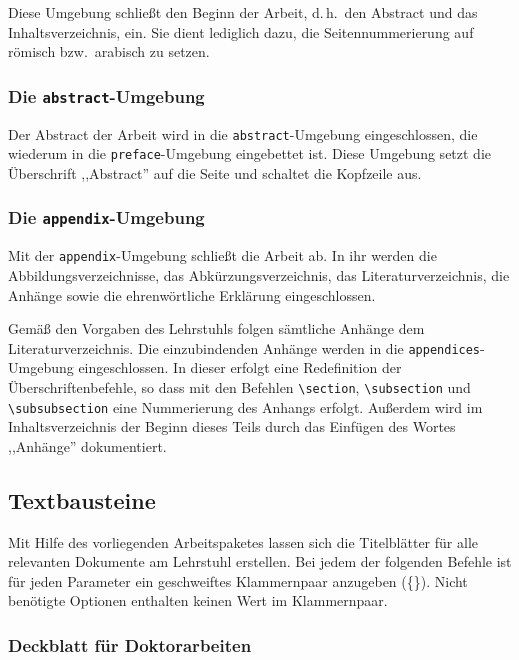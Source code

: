 \documentclass[english, trackchanges, hyperref, ngerman ,pdf, mp, mppdf]{wise}
\newcommand\code[1]{\texttt{#1}}
\newcommand\command[1]{\code{\textbackslash{}#1}}
\begin{document}
Diese Umgebung schließt den Beginn der Arbeit, d.\,h.\ den Abstract
und das Inhaltsverzeichnis, ein. Sie dient lediglich dazu, die Seitennummerierung
auf römisch bzw.\ arabisch zu setzen.


\subsubsection{Die \code{abstract}-Umgebung}

Der Abstract der Arbeit wird in die \code{abstract}-Umgebung eingeschlossen,
die wiederum in die \code{preface}-Umgebung eingebettet ist. Diese
Umgebung setzt die Überschrift ,,Abstract'' auf die Seite und schaltet
die Kopfzeile aus.


\subsubsection{Die \code{appendix}-Umgebung}\label{sec:appendix}

Mit der \code{appendix}-Umgebung schließt die Arbeit ab. In ihr
werden die Abbildungsverzeichnisse, das Abkürzungsverzeichnis, das
Literaturverzeichnis, die Anhänge sowie die ehrenwörtliche Erklärung
eingeschlossen.

Gemäß den Vorgaben des Lehrstuhls folgen sämtliche Anhänge dem Literaturverzeichnis.
Die einzubindenden Anhänge werden in die \code{appendices}-Umgebung
eingeschlossen. In dieser erfolgt eine Redefinition der Überschriftenbefehle,
so dass mit den Befehlen \command{section}, \command{subsection}
und \command{subsubsection} eine Nummerierung des Anhangs
erfolgt. Außerdem wird im Inhaltsverzeichnis der Beginn dieses Teils
durch das Einfügen des Wortes ,,Anhänge'' dokumentiert.


\subsection{Textbausteine}\label{sec:textbausteine}

Mit Hilfe des vorliegenden Arbeitspaketes lassen sich die Titelblätter
für alle relevanten Dokumente am Lehrstuhl erstellen. Bei jedem der
folgenden Befehle ist für jeden Parameter ein geschweiftes Klammernpaar
anzugeben (\{\}). Nicht benötigte Optionen enthalten keinen Wert im
Klammernpaar.


\subsubsection{Deckblatt für Doktorarbeiten}
\end{document}
